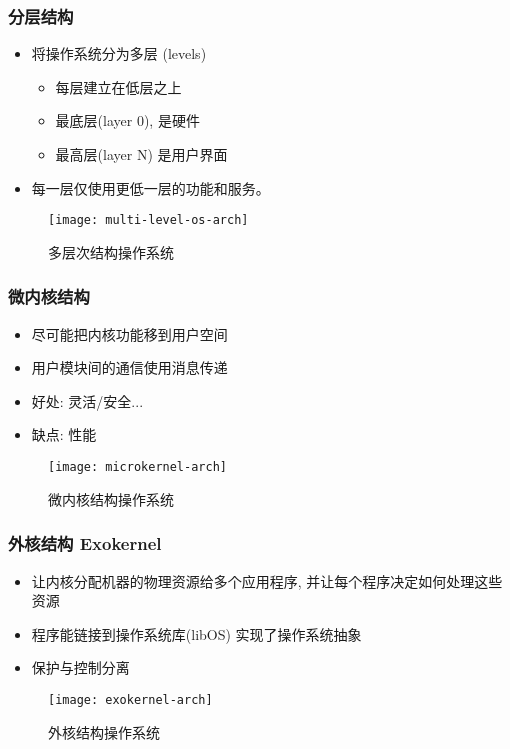 \documentclass[UTF8]{ctexbeamer}
\begin{document}
\begin{frame}
	
	\frametitle{分层结构}
	
	\begin{itemize}
		\item 将操作系统分为多层 (levels)
		\begin{itemize}
			\item 每层建立在低层之上
			\item 最底层(layer 0), 是硬件
			\item 最高层(layer N) 是用户界面
		\end{itemize}
	\item 每一层仅使用更低一层的功能和服务。
	\end{itemize}
	\begin{figure}
		\centering
		\texttt{[image: multi-level-os-arch]}
		\caption{多层次结构操作系统}
	\end{figure}
	
\end{frame}



\begin{frame}
	
	\frametitle{微内核结构}
	
	\begin{itemize}
		\item 尽可能把内核功能移到用户空间
		\item 用户模块间的通信使用消息传递
		\item 好处: 灵活/安全...
		\item 缺点: 性能
	\end{itemize}
	\begin{figure}
		\centering
		\texttt{[image: microkernel-arch]}
		\caption{微内核结构操作系统}
	\end{figure}
	
\end{frame}



\begin{frame}
	
	\frametitle{外核结构 Exokernel}
	
	\begin{itemize}
		\item 让内核分配机器的物理资源给多个应用程序, 并让每个程序决定如何处理这些资源
		\item 程序能链接到操作系统库(libOS) 实现了操作系统抽象
		\item 保护与控制分离
	\end{itemize}
	\begin{figure}
		\centering
		\texttt{[image: exokernel-arch]}
		\caption{外核结构操作系统}
	\end{figure}
	
\end{frame}
\end{document}

